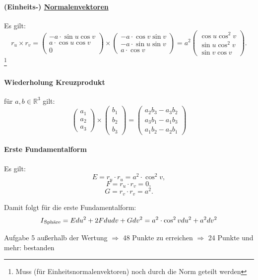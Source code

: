 \documentclass[a4paper,11pt,notitlepage]{report}
\theoremstyle{definition}
\newcommand{\R}{{\ensuremath{\mathbb{R}}}}
\newcommand{\RM}[1]{\MakeUppercase{\romannumeral #1{}}}
\begin{document}
\paragraph{(Einheits-) \underline{Normalenvektoren}}
Es gilt:
$$r_u \times r_v = \begin{pmatrix}
- a \cdot \sin u \cos v \\ a \cdot \cos u \cos v \\ 0
\end{pmatrix} \times \begin{pmatrix}
- a \cdot \cos v \sin v \\ -a \cdot \sin u \sin v \\ a \cdot \cos v
\end{pmatrix} = a^2 \begin{pmatrix}
\cos u \cos^2 v \\ \sin u \cos^2 v \\ \sin v \cos v
\end{pmatrix}.$$ \footnote{Muss (für Einheitsnormalenvektoren) noch durch die Norm geteilt werden}
\newline
\hrulefill
\newline \paragraph{Wiederholung Kreuzprodukt}
für $a,b \in \R^3$ gilt:
$$\begin{pmatrix}
a_1 \\ a_2 \\ a_3
\end{pmatrix} \times \begin{pmatrix}
b_1 \\ b_2 \\ b_3
\end{pmatrix} = \begin{pmatrix}
a_2b_3 - a_3b_2 \\ a_3b_1 - a_1 b_3 \\ a_1 b_2 - a_2 b_1
\end{pmatrix}$$

\paragraph{Erste Fundamentalform}
Es gilt:
$$E = r_u \cdot r_u = a^2 \cdot \cos^2 v,$$
$$F = r_u \cdot r_v = 0,$$
$$G = r_v \cdot r_v = a^2.$$

Damit folgt für die erste Fundamentalform:
$$\RM{1}_\text{Sphäre} = E du^2 + 2 F du dv + G dv^2 = a^2 \cdot \cos^2 v du^2 + a^2 dv^2$$

\hrulefill
\newline
Aufgabe 5 außerhalb der Wertung
\newline
$\Rightarrow$ 48 Punkte zu erreichen
$\Rightarrow$ 24 Punkte und mehr: bestanden
\end{document}
